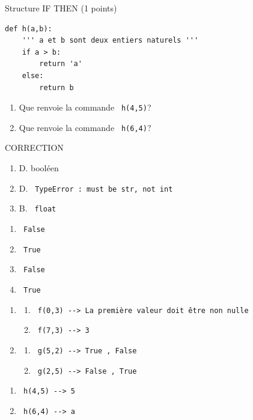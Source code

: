 \documentclass[a4paper,12pt,openany]{book}
\begin{document}
\bigskip

\exo \qquad Structure IF THEN \hfill
(1 points)

\begin{lstlisting}
def h(a,b):
	''' a et b sont deux entiers naturels '''
	if a > b:
		return 'a'
	else:
		return b

\end{lstlisting}

\begin{enumerate}
	\item Que renvoie la commande \verb+ h(4,5)+? \dotfill
	\item Que renvoie la commande \verb+ h(6,4)+? \dotfill

\end{enumerate}





  
  \newpage
  
  
  \begin{center}
  {\LARGE CORRECTION}
  \end{center}
  
\setcounter{nexo}{0}
  
  \exo
  
  \begin{enumerate}
  	\item D. booléen
  	\item D. \verb+ TypeError : must be str, not int+
  	\item B. \verb+ float +
  \end{enumerate}
  
  \medskip
  
  \exo 
  
  \begin{enumerate}
  	\item \verb+ False +
  	\item \verb+ True +
  	\item \verb+ False +
  	\item \verb+ True +
  \end{enumerate}
  
  \medskip
  
  \exo
  
  \begin{enumerate}
  \item 
  	\begin{enumerate}
  	\item \verb+ f(0,3) --> La première valeur doit être non nulle+
  	\item \verb+ f(7,3) --> 3+
  \end{enumerate}
  
  \medskip
  
  \item 
  
  \begin{enumerate}
  	\item \verb+ g(5,2) --> True , False +
  	\item \verb+ g(2,5) --> False , True+
  \end{enumerate}
  \end{enumerate}
  
  \medskip
  
  \exo
  
  \begin{enumerate}
  	\item \verb+ h(4,5) --> 5+
  	\item \verb+ h(6,4) --> a+
  \end{enumerate}
  
 
\end{document}
